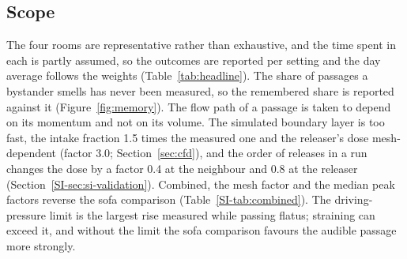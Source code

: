 \subsection{Scope}
\label{sec:scope}
The four rooms are representative rather than exhaustive, and the time spent in each is partly assumed, so the
outcomes are reported per setting and the day average follows the weights (Table~\ref{tab:headline}). The share of passages a bystander smells has never been
measured, so the remembered share is reported against it (Figure~\ref{fig:memory}). The flow path of a passage is
taken to depend on its momentum and not on its volume. The simulated boundary layer is too fast, the intake fraction
1.5 times the measured one and the releaser's dose mesh-dependent (factor 3.0; Section~\ref{sec:cfd}), and the order of releases in a run
changes the dose by a factor 0.4 at the neighbour and 0.8 at the releaser (Section~\ref{SI-sec:si-validation}). Combined, the mesh factor and the median peak factors reverse the sofa comparison
(Table~\ref{SI-tab:combined}). The driving-pressure limit is the largest rise measured while passing flatus;
straining can exceed it, and without the limit the sofa comparison favours the audible passage more strongly.
